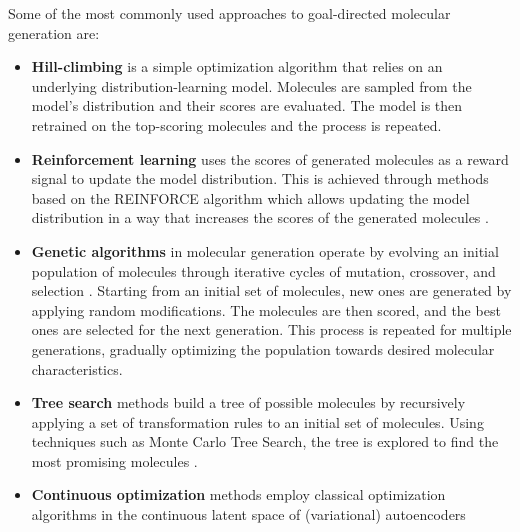 Some of the most commonly used approaches to goal-directed molecular generation are:
\begin{itemize}
      \item \textbf{Hill-climbing}
            \citep{seglerGeneratingFocusedMolecule2018,xieMARSMarkovMolecular2021,thomasAugmentedHillClimbIncreases2022}
            is a simple optimization algorithm that relies on an underlying distribution-learning model.
            Molecules are sampled from the model's distribution and their scores are evaluated.
            The model is then retrained on the top-scoring molecules and the process is repeated.
      \item \textbf{Reinforcement learning} uses the scores of generated molecules as a reward signal to update
            the model distribution. This is achieved through methods based on the REINFORCE algorithm
            \citep{williamsSimpleStatisticalGradientfollowing1992} which allows updating the model
            distribution in a way that increases the scores of the generated molecules
            \citep{olivecronaMolecularDenovoDesign2017,thomasAugmentedHillClimbIncreases2022,youGraphConvolutionalPolicy2019,guoAugmentedMemoryCapitalizing2023}.
      \item \textbf{Genetic algorithms} in molecular generation operate by evolving an initial
            population of molecules through iterative cycles of mutation, crossover, and selection
            \citep{jensenGraphbasedGeneticAlgorithm2019,nigamGenerativeModelsSuperfast2021,yoshikawaPopulationbasedNovoMolecule2018}.
            Starting from an initial set of molecules, new ones are generated by applying
            random modifications. The molecules are then scored, and the best ones are
            selected for the next generation. This process is repeated for multiple generations,
            gradually optimizing the population towards desired molecular characteristics.
      \item \textbf{Tree search} methods build a tree of possible molecules by recursively applying a set of transformation rules
            to an initial set of molecules. Using techniques such as Monte Carlo Tree Search, the tree is
            explored to find the most promising molecules \citep{yangChemTSEfficientPython2017,jensenGraphbasedGeneticAlgorithm2019}.
      \item \textbf{Continuous optimization} methods employ classical optimization algorithms in the continuous
            latent space of (variational) autoencoders
            \citep{gomez-bombarelliAutomaticChemicalDesign2018,kusnerGrammarVariationalAutoencoder2017,winterEfficientMultiobjectiveMolecular2019}

\end{itemize}
